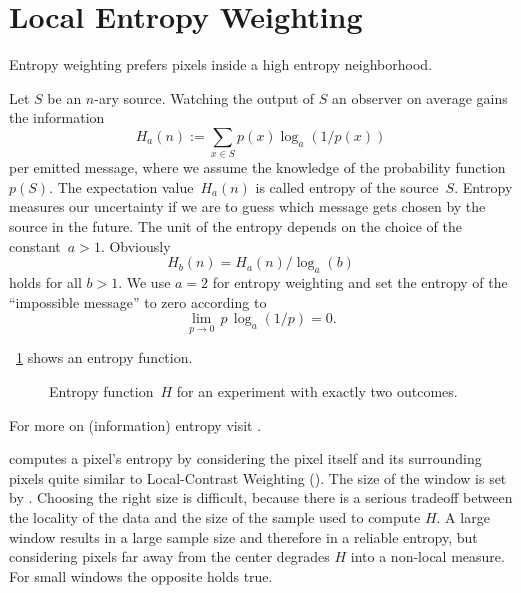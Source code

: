 

\section[Local Entropy Weighting]{\label{sec:local-entropy-weighting}%
  Local Entropy Weighting}

Entropy weighting prefers pixels inside a high entropy neighborhood.

Let $S$ be an $n$-ary source.  Watching the output of $S$ an observer
on average gains the information
\[
    H_a(n) := \sum_{x \in S} p(x) \log_a(1 / p(x))
\]
\noindent per emitted message, where we assume the knowledge of the probability function~$p(S)$.
The expectation value~$H_a(n)$ is called entropy of the source~$S$.  Entropy measures our
uncertainty if we are to guess which message gets chosen by the source in the future.  The unit
of the entropy depends on the choice of the constant~$a > 1$.  Obviously
\[
    H_b(n) = H_a(n) / \log_a(b)
\]
\noindent holds for all $b > 1$.  We use $a = 2$ for entropy weighting and set the entropy of
the ``impossible message'' to zero according to
\[
    \lim_{p \rightarrow 0} \, p \, \log_a(1 / p) = 0.
\]

\figureName~\ref{fig:entropy} shows an entropy function.


\begin{figure}[htbp]
  \ifreferencemanual\begin{maxipage}\fi
  \centering
  \ifreferencemanual\end{maxipage}\fi

  \caption[Entropy function]{\label{fig:entropy}Entropy function~$H$ for an experiment with
    exactly two outcomes.}
\end{figure}


For more on (information) entropy visit .

%
\App{} computes a pixel's entropy by considering the pixel itself and its surrounding pixels
quite similar to Local-Contrast Weighting ().  The size of
the window is set by .  Choosing the right size is difficult,
because there is a serious tradeoff between the locality of the data and the size of the sample
used to compute $H$.  A large window results in a large sample size and therefore in a reliable
entropy, but considering pixels far away from the center degrades $H$ into a non-local measure.
For small windows the opposite holds true.

